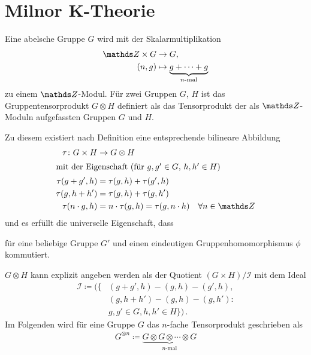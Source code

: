 \documentclass[ngerman,fontsize=11pt, paper=a4, parskip=half, titlepage=true, toc=bib]{scrartcl}
\begin{document}
\maketitle
\tableofcontents


\section{Milnor K-Theorie}

\begin{Bem}[Gruppentensorprodukt]
  Eine abelsche Gruppe $G$ wird mit der Skalarmultiplikation
  \begin{align*}
    \Z \times G &\to G,\\
    (n,g)&\mapsto \underbrace{g+\dotsb+g}_{\scriptsize\text{$n$-mal}}
  \end{align*}
  zu einem $\Z$-Modul.
  Für zwei Gruppen $G$, $H$ ist das 
  Gruppentensorprodukt $G\otimes H$
  definiert als das Tensorprodukt der als $\Z$-Moduln
  aufgefassten Gruppen $G$ und $H$.

  Zu diesem existiert nach Definition eine 
  entsprechende bilineare Abbildung
  \begin{align*}
    \tau\colon G\times H&\rightarrow G\otimes H\\
    \intertext{mit der Eigenschaft (für $g,g'\in G$, $h,h'\in H$)}
    \tau(g+g',h) &= \tau(g,h)+\tau(g',h)\\
    \tau(g,h+h') &= \tau(g,h)+\tau(g,h')\\
    \tau(n\cdot g, h) &= n\cdot \tau(g,h)= \tau(g,n\cdot h)\quad
                        \forall n \in\Z
  \end{align*}
  und es erfüllt die universelle Eigenschaft, dass
  \begin{center}
  \end{center}
  für eine beliebige Gruppe $G'$ und einen eindeutigen Gruppenhomomorphismus $\phi$
  kommutiert.

  $G\otimes H$ kann explizit angeben werden als der Quotient
  $(G\times H) / \mathcal{I}$ mit dem Ideal 
  \begin{align*}
    \mathcal{I}\coloneqq \big(
    \big\{&(g+g',h)-(g,h)-(g',h), \\
          &(g,h+h')-(g,h)-(g,h') \colon\\
          &g,g'\in G, h,h'\in H \big\}
            \big)\,.
  \end{align*}
  Im Folgenden wird für eine Gruppe $G$ das $n$-fache Tensorprodukt
  geschrieben als
  \begin{gather*}
    G^{\otimes n}
    \coloneqq \underbrace{G\otimes G\otimes\dotsb\otimes G}_{n\text{-mal}}
  \end{gather*}
\end{Bem}
\end{document}
